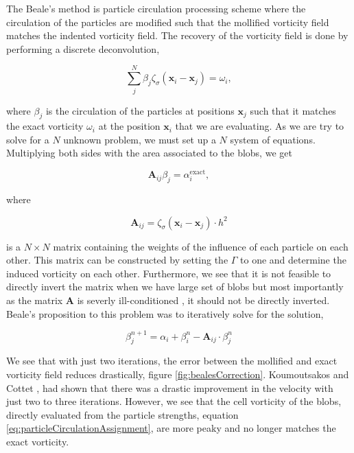 The Beale's method is particle circulation processing scheme where the circulation of the particles are modified such that the mollified vorticity field matches the indented vorticity field. The recovery of the vorticity field is done by performing a discrete deconvolution,

	\begin{equation}
	\sum_j^N \beta_j \zeta_{\sigma}\left(\mathbf{x}_i-\mathbf{x}_j\right) = \omega_i,
		\end{equation}

where $\beta_j$ is the circulation of the particles at positions $\mathbf{x}_j$ such that it matches the exact vorticity $\omega_i$ at the position $\mathbf{x}_i$ that we are evaluating.  As we are try to solve for a $N$ unknown problem, we must set up a $N$ system of equations. Multiplying both sides with the area associated to the blobs, we get

	\begin{equation}
	\mathbf{A}_{ij} \beta_j = \alpha_i^{\mathrm{exact}},
	\end{equation}
	
where

	\begin{equation}
	\mathbf{A}_{ij} = \zeta_{\sigma}\left(\mathbf{x}_i - \mathbf{x}_j\right) \cdot h^2
	\end{equation}

is a $N \times N$ matrix containing the weights of the influence of each particle on each other. This matrix can be constructed by setting the $\Gamma$ to one and determine the induced vorticity on each other. Furthermore, we see that it is not feasible to directly invert the matrix when we have large set of blobs but most importantly as the matrix $\mathbf{A}$ is severly ill-conditioned \cite{Speck2011a}, it should not be directly inverted. Beale's proposition to this problem was to iteratively solve for the solution,

	\begin{equation}
	\beta_{j}^{n+1} = \alpha_i + \beta_i^n - \mathbf{A}_{ij}\cdot\beta_j^n
	\end{equation}
	
We see that with just two iterations, the error between the mollified and exact vorticity field reduces drastically, figure \ref{fig:bealesCorrection}. Koumoutsakos and Cottet \cite{Cottet2000a}, had shown that there was a drastic improvement in the velocity with just two to three iterations. However, we see that the cell vorticity of the blobs, directly evaluated from the particle strengths, equation \ref{eq:particleCirculationAssignment}, are more peaky and no longer matches the exact vorticity. 

